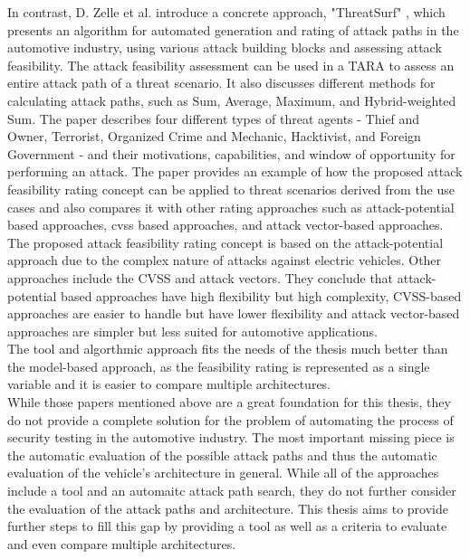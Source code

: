 In contrast, D. Zelle et al. introduce a concrete approach, "ThreatSurf" \cite{threat_surf}, which presents an algorithm for automated generation and rating of 
attack paths in the automotive industry, using various attack building blocks and assessing attack feasibility.
The attack feasibility assessment can be used in a TARA to assess an entire attack path of a threat scenario.
It also discusses different methods for calculating attack paths, such as Sum, Average, Maximum, and Hybrid-weighted Sum. 
The paper describes four different types of threat agents - Thief and Owner, Terrorist, Organized Crime and Mechanic, Hacktivist, and Foreign Government - 
and their motivations, capabilities, and window of opportunity for performing an attack. 
The paper provides an example of how the proposed attack feasibility rating concept can be applied to threat scenarios derived from the use cases and also 
compares it with other rating approaches such as attack-potential based approaches, \gls{cvss} based approaches, and attack vector-based approaches.
The proposed attack feasibility rating concept is based on the attack-potential approach due to the complex nature of attacks against electric vehicles.
Other approaches include the CVSS and attack vectors.
They conclude that attack-potential based approaches have high flexibility but high complexity, 
CVSS-based approaches are easier to handle but have lower flexibility and attack vector-based approaches are simpler but less suited for automotive applications.\\
The tool and algorthmic approach fits the needs of the thesis much better than the model-based approach, as the feasibility rating is represented as a single variable and it is easier to compare multiple architectures.\\

While those papers mentioned above are a great foundation for this thesis, they do not provide a complete solution for the problem of automating the process of security testing in the automotive industry.
The most important missing piece is the automatic evaluation of the possible attack paths and thus the automatic evaluation of the vehicle's architecture in general.
While all of the approaches include a tool and an automaitc attack path search, they do not further consider the evaluation of the attack paths and architecture.
This thesis aims to provide further steps to fill this gap by providing a tool as well as a criteria to evaluate and even compare multiple architectures.
